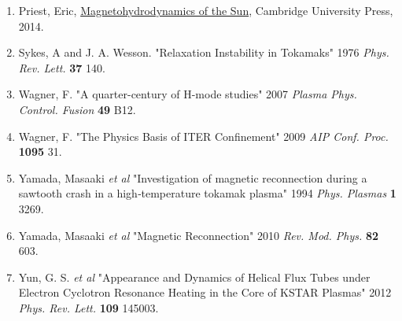 \documentclass{article}
\begin{document}
\begin{enumerate}
\item Priest, Eric,  \underline{Magnetohydrodynamics of the Sun},  Cambridge University Press, 2014.
\item Sykes, A and J. A. Wesson.  "Relaxation Instability in Tokamaks" 1976 \textit{Phys. Rev. Lett.} \textbf{37} 140.
\item Wagner, F. "A quarter-century of H-mode studies" 2007 \textit{Plasma Phys. Control. Fusion} \textbf{49} B12.
\item Wagner, F. "The Physics Basis of ITER Confinement" 2009 \textit{AIP Conf. Proc.} \textbf{1095} 31.
\item Yamada, Masaaki \textit{et al} "Investigation of magnetic reconnection during a sawtooth crash in a high‐temperature tokamak plasma" 1994 \textit{Phys. Plasmas} \textbf{1} 3269.
\item Yamada, Masaaki \textit{et al} "Magnetic Reconnection" 2010 \textit{Rev. Mod. Phys.} \textbf{82} 603.
\item Yun, G. S. \textit{et al} "Appearance and Dynamics of Helical Flux Tubes under Electron Cyclotron Resonance Heating in the Core of KSTAR Plasmas" 2012 \textit{Phys. Rev. Lett.} \textbf{109} 145003.
\end{enumerate}
\end{document}
